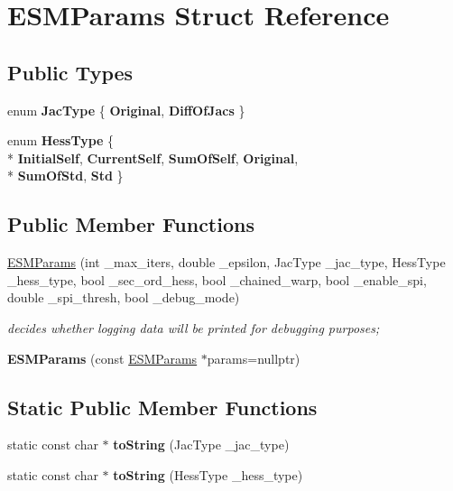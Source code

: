 \hypertarget{structESMParams}{\section{E\-S\-M\-Params Struct Reference}
\label{structESMParams}
}
\subsection*{Public Types}
\begin{DoxyCompactItemize}
\item 
enum {\bfseries Jac\-Type} \{ {\bfseries Original}, 
{\bfseries Diff\-Of\-Jacs}
 \}
\item 
enum {\bfseries Hess\-Type} \{ \\*
{\bfseries Initial\-Self}, 
{\bfseries Current\-Self}, 
{\bfseries Sum\-Of\-Self}, 
{\bfseries Original}, 
\\*
{\bfseries Sum\-Of\-Std}, 
{\bfseries Std}
 \}
\end{DoxyCompactItemize}
\subsection*{Public Member Functions}
\begin{DoxyCompactItemize}
\item 
\hyperlink{structESMParams_a28ec1cebb9e00b95b5155871afeaec6c}{E\-S\-M\-Params} (int \-\_\-max\-\_\-iters, double \-\_\-epsilon, Jac\-Type \-\_\-jac\-\_\-type, Hess\-Type \-\_\-hess\-\_\-type, bool \-\_\-sec\-\_\-ord\-\_\-hess, bool \-\_\-chained\-\_\-warp, bool \-\_\-enable\-\_\-spi, double \-\_\-spi\-\_\-thresh, bool \-\_\-debug\-\_\-mode)
\begin{DoxyCompactList}\small\item\em decides whether logging data will be printed for debugging purposes; \end{DoxyCompactList}\item 
\hypertarget{structESMParams_a11c8741a6ea5898281ac135b58d69579}{{\bfseries E\-S\-M\-Params} (const \hyperlink{structESMParams}{E\-S\-M\-Params} $\ast$params=nullptr)}\label{structESMParams_a11c8741a6ea5898281ac135b58d69579}

\end{DoxyCompactItemize}
\subsection*{Static Public Member Functions}
\begin{DoxyCompactItemize}
\item 
\hypertarget{structESMParams_a6ebf3b0596f90032a2ee9203edcb0b55}{static const char $\ast$ {\bfseries to\-String} (Jac\-Type \-\_\-jac\-\_\-type)}\label{structESMParams_a6ebf3b0596f90032a2ee9203edcb0b55}

\item 
\hypertarget{structESMParams_a3253f737890f9aeffe6e0bf2c38bbabf}{static const char $\ast$ {\bfseries to\-String} (Hess\-Type \-\_\-hess\-\_\-type)}\label{structESMParams_a3253f737890f9aeffe6e0bf2c38bbabf}

\end{DoxyCompactItemize}
